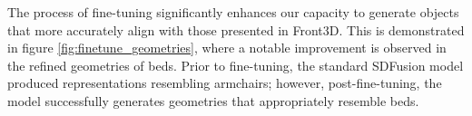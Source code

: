 The process of fine-tuning significantly enhances our capacity to generate objects that more accurately align with those presented in Front3D. This is demonstrated in figure \ref{fig:finetune_geometries}, where a notable improvement is observed in the refined geometries of beds. Prior to fine-tuning, the standard SDFusion model produced representations resembling armchairs; however, post-fine-tuning, the model successfully generates geometries that appropriately resemble beds.

